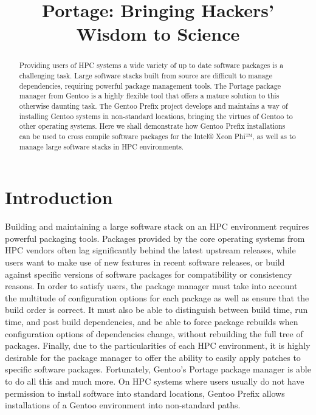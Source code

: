 \documentclass[a4paper,conference]{IEEEtran}
\title{Portage: Bringing Hackers' Wisdom to Science}
\author{
  \IEEEauthorblockN{Guilherme Amadio}
  \IEEEauthorblockA{São Paulo State University, Brazil\\
                    Gentoo Linux\\amadio@gentoo.org}
  \and
  \IEEEauthorblockN{Benda Xu}
  \IEEEauthorblockA{The University of Tokyo, Japan\\
                    Gentoo Linux\\heroxbd@gentoo.org}
}
\begin{document}
\maketitle

\begin{abstract}

Providing users of HPC systems a wide variety of up to date software
packages is a challenging task. Large software stacks built from source
are difficult to manage dependencies, requiring powerful package
management tools. The Portage package manager from Gentoo is a highly
flexible tool that offers a mature solution to this otherwise daunting
task. The Gentoo Prefix project develops and maintains a way of
installing Gentoo systems in non-standard locations, bringing the
virtues of Gentoo to other operating systems. Here we shall demonstrate
how Gentoo Prefix installations can be used to cross compile software
packages for the Intel® Xeon Phi™, as well as to manage large software
stacks in HPC environments.

\end{abstract}

\section{Introduction}

Building and maintaining a large software stack on an HPC environment
requires powerful packaging tools. Packages provided by the core operating
systems from HPC vendors often lag significantly behind the latest
upstream releases, while users want to make use of new features in
recent software releases, or build against specific versions of software
packages for compatibility or consistency reasons. In order to satisfy
users, the package manager must take into account the multitude of
configuration options for each package as well as ensure that the build
order is correct. It must also be able to distinguish between build
time, run time, and post build dependencies, and be able to force
package rebuilds when configuration options of dependencies change,
without rebuilding the full tree of packages. Finally, due to the
particularities of each HPC environment, it is highly desirable for the
package manager to offer the ability to easily apply patches to specific
software packages. Fortunately, Gentoo's \cite{gentoo} Portage
\cite{gentoo:portage} package manager is able to do all this and much
more. On HPC systems where users usually do not have permission to
install software into standard locations, Gentoo Prefix
\cite{gentoo:prefix} allows installations of a Gentoo environment into
non-standard paths.
\end{document}
